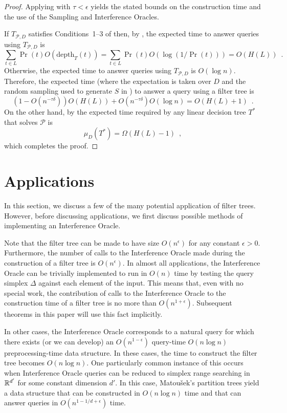 \documentclass{patmorin}
\newcommand{\depth}{\mathrm{depth}}
\begin{document}
\begin{proof}
  Applying  with $\tau < \epsilon$
  yields the stated bounds on the construction time and the use of the
  Sampling and Interference Oracles.

  If $T_{\mathcal{P},D}$ satisfies Conditions~1--3 of 
   then, by ,
  the expected time to answer queries using $T_{\mathcal{P},D}$ is
  \[
     \sum_{t\in L} \Pr(t)O(\depth_T(t)) 
          = \sum_{t\in L}\Pr(t)O(\log(1/\Pr(t))) = O(H(L)) \enspace .
  \]
  Otherwise, the expected time to answer queries using $T_{\mathcal{P},D}$
  is $O(\log n)$.  Therefore, the expected time (where the expectation
  is taken over $D$ and the random sampling used to generate $S$ in
  ) to answer a query using a filter tree is
  \[
     (1-O(n^{-\tau\delta})) O(H(L)) + O(n^{-\tau\delta}) O(\log n) =
        O(H(L)+1)  \enspace .
  \]
  On the other hand, by  the expected time required
  by any linear decision tree $T^*$ that solves $\mathcal{P}$ is
  \[
      \mu_D(T^*) = \Omega(H(L) - 1) \enspace ,
  \]
  which completes the proof.
\end{proof}

\section{Applications}

In this section, we discuss a few of the many potential application of
filter trees.  However, before discussing applications, we first discuss
possible methods of implementing an Interference Oracle.

Note that the filter tree can be made to have size $O(n^\epsilon)$
for any constant $\epsilon > 0$.  Furthermore, the number of calls to
the Interference Oracle made during the construction of a filter tree
is $O(n^\epsilon)$.  In almost all applications, the Interference Oracle
can be trivially implemented to run in $O(n)$ time by testing the query
simplex $\Delta$ against each element of the input.  This means that,
even with no special work, the contribution of calls to the Interference
Oracle to the construction time of a filter tree is no more than
$O(n^{1+\epsilon})$.  Subsequent theorems in this paper will use this fact
implicitly.

In other cases, the Interference Oracle corresponds to a natural query
for which there exists (or we can develop) an $O(n^{1-\epsilon})$
query-time $O(n\log n)$ preprocessing-time data structure.  In these
cases, the time to construct the filter tree becomes $O(n\log n)$.
One particularly common instance of this occurs when Interference Oracle
queries can be reduced to simplex range searching in $\mathbb{R}^{d'}$ for some
constant dimension $d'$.  In this case, Matou\v{s}ek's partition trees
yield a data structure that can be constructed in $O(n\log n)$ time and
that can answer queries in $O(n^{1-1/d+\epsilon})$ time.
\end{document}
